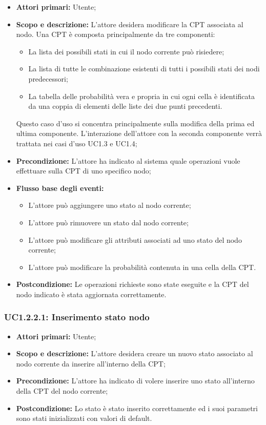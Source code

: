 \begin{itemize} 
	\item{\textbf{Attori primari:} Utente;} 
	\item{\textbf{Scopo e descrizione:} L'attore desidera modificare la CPT associata al nodo. Una CPT è composta principalmente da tre componenti: 
	\begin{itemize} 
		\item{La lista dei possibili stati in cui il nodo corrente può risiedere;} 
		\item{La lista di tutte le combinazione esistenti di tutti i possibili stati dei nodi predecessori;} 
		\item{La tabella delle probabilità vera e propria in cui ogni cella è identificata da una coppia di elementi delle liste dei due punti precedenti.} 
	\end{itemize} 
	Questo caso d'uso si concentra principalmente sulla modifica della prima ed ultima componente. L'interazione dell'attore con la seconda componente verrà trattata nei casi d'uso UC1.3 e UC1.4;
} 
	\item{\textbf{Precondizione:} L'attore ha indicato al sistema quale operazioni vuole effettuare sulla CPT di uno specifico nodo;} 
	\item{\textbf{Flusso base degli eventi:} } 
	\begin{itemize} 
		\item{L'attore può aggiungere uno stato al nodo corrente;} 
		\item{L'attore può rimuovere un stato dal nodo corrente;} 
		\item{L'attore può modificare gli attributi associati ad uno stato del nodo corrente;} 
		\item{L'attore può modificare la probabilità contenuta in una cella della CPT.} 
	\end{itemize} 
	\item{\textbf{Postcondizione:} Le operazioni richieste sono state eseguite e la CPT del nodo indicato è stata aggiornata correttamente.} 
\end{itemize} 
\subsubsection{UC1.2.2.1: Inserimento stato nodo} 
\begin{itemize} 
	\item{\textbf{Attori primari:} Utente;} 
	\item{\textbf{Scopo e descrizione:} L'attore desidera creare un nuovo stato associato al nodo corrente da inserire all'interno della CPT;} 
	\item{\textbf{Precondizione:} L'attore ha indicato di volere inserire uno stato all'interno della CPT del nodo corrente;} 
	\item{\textbf{Postcondizione:} Lo stato è stato inserito correttamente ed i suoi parametri sono stati inizializzati con valori di default.} 
\end{itemize} 
